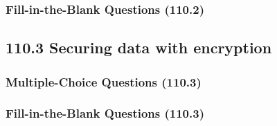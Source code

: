 \documentclass[a4paper]{report}
\begin{document}
\subsubsection*{Fill-in-the-Blank Questions (110.2)}

\subsection*{110.3 Securing data with encryption}
\subsubsection*{Multiple-Choice Questions (110.3)}

\subsubsection*{Fill-in-the-Blank Questions (110.3)}
\end{document}
